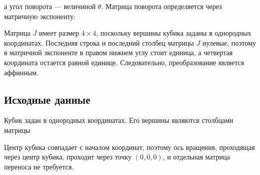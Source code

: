 \documentclass[a4paper,14pt]{extarticle}
\begin{document}
\begin{center}\end{center}

а угол поворота — величиной $\theta$. Матрица поворота определяется через матричную экспоненту:

\begin{center}\end{center}

Матрица $J$ имеет размер $4 \times 4$, поскольку вершины кубика заданы в однородных координатах. Последняя строка и последний столбец матрицы $J$ нулевые, поэтому в матричной экспоненте в правом нижнем углу стоит единица, а четвертая координата остается равной единице. Следовательно, преобразование является аффинным.

\subsection*{Исходные данные}

Кубик задан в однородных координатах. Его вершины являются столбцами матрицы

\begin{center}\end{center}

Центр кубика совпадает с началом координат, поэтому ось вращения, проходящая через центр кубика, проходит через точку $(0,0,0)$, и отдельная матрица переноса не требуется.
\end{document}
